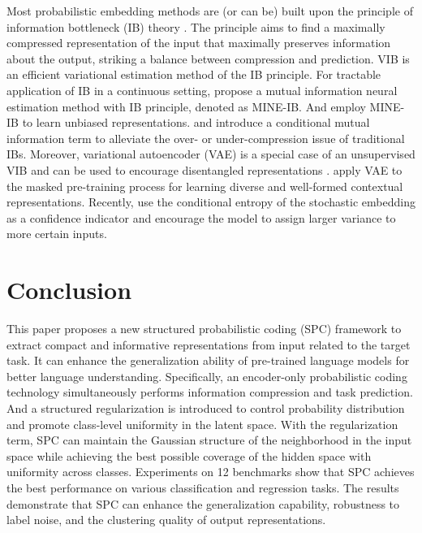 \documentclass[letterpaper]{article} %
\begin{document}
Most probabilistic embedding methods \cite{DBLP:journals/corr/KingmaW13,DBLP:conf/iclr/AlemiFD017,DBLP:conf/iclr/HigginsMPBGBML17,DBLP:journals/entropy/Fischer20,DBLP:conf/cvpr/AnJC23} are (or can be) built upon the principle of information bottleneck (IB) theory \cite{tishby1999information,tishby2015deep}.
The principle aims to find a maximally compressed representation of the input that maximally preserves information about the output, striking a balance between compression and prediction. 
VIB \cite{DBLP:conf/iclr/AlemiFD017} is an efficient variational estimation method of the IB principle. 
For tractable application of IB in a continuous setting, \citet{DBLP:conf/icml/BelghaziBROBHC18} propose a mutual information neural estimation method with IB principle, denoted as MINE-IB.
And \citet{DBLP:conf/cvpr/RagonesiVCM21} employ MINE-IB to learn unbiased representations.
\citet{DBLP:journals/entropy/Fischer20} and \citet{DBLP:conf/iclr/RameC21} introduce a conditional mutual information term to alleviate the over- or under-compression issue of traditional IBs.
Moreover, 
variational autoencoder (VAE) \cite{DBLP:journals/corr/KingmaW13} is a special case of an unsupervised VIB and can be used to encourage disentangled representations
\cite{DBLP:conf/iclr/HigginsMPBGBML17}.  
\citet{DBLP:conf/emnlp/0001HDZJMS22} 
apply VAE to the masked pre-training process for learning diverse and well-formed contextual representations.
Recently, \citet{DBLP:conf/cvpr/AnJC23} use the conditional entropy of the stochastic embedding as a confidence indicator and encourage the model to assign larger variance to more certain inputs.



\section{Conclusion}
This paper proposes a new structured probabilistic coding (SPC) framework to extract compact and informative representations from input related to the target task. It can enhance the generalization ability of pre-trained language models for better language understanding. Specifically, an encoder-only probabilistic coding technology simultaneously performs information compression and task prediction. And a structured regularization is introduced to control probability distribution and promote class-level uniformity in the latent space. 
With the regularization term, SPC can maintain the Gaussian structure of the neighborhood in the input space while achieving the best possible coverage of the hidden space with uniformity across classes.
Experiments on 12 benchmarks show that SPC achieves the best performance on various classification and regression tasks. The results demonstrate that SPC can enhance the generalization capability, robustness to label noise, and the clustering quality of output representations. 
\end{document}
